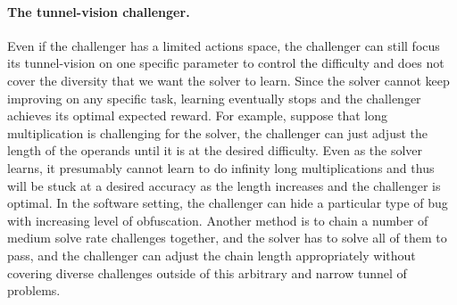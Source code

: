 \paragraph{The tunnel-vision challenger.}
Even if the challenger has a limited actions space, the challenger can still focus its tunnel-vision on one specific parameter to control the difficulty and does not cover the diversity that we want the solver to learn. Since the solver cannot keep improving on any specific task, learning eventually stops and the challenger achieves its optimal expected reward. For example, suppose that long multiplication is challenging for the solver, the challenger can just adjust the length of the operands until it is at the desired difficulty. Even as the solver learns, it presumably cannot learn to do infinity long multiplications and thus will be stuck at a desired accuracy as the length increases and the challenger is optimal. In the software setting, the challenger can hide a particular type of bug with increasing level of obfuscation. Another method is to chain a number of medium solve rate challenges together, and the solver has to solve all of them to pass, and the challenger can adjust the chain length appropriately without covering diverse challenges outside of this arbitrary and narrow tunnel of problems.

